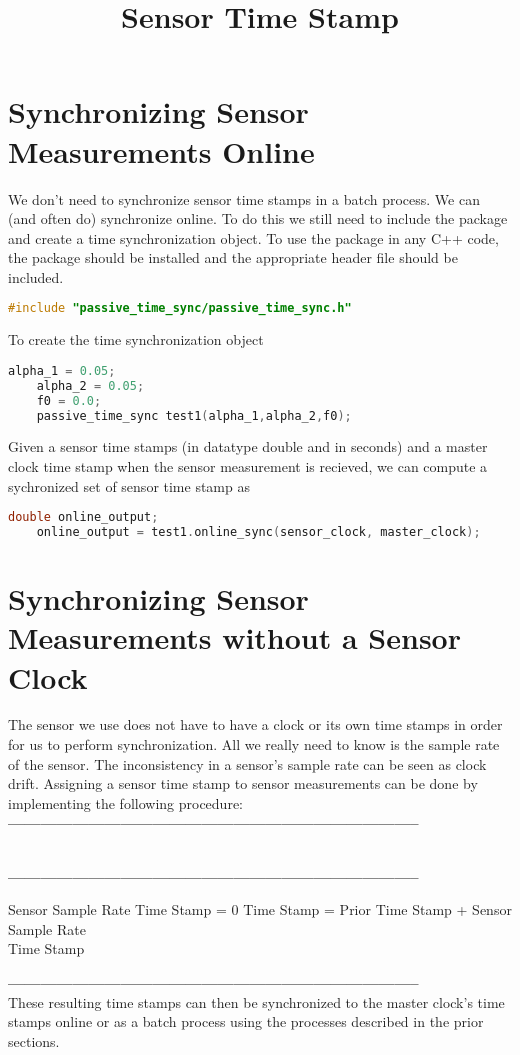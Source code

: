 \documentclass[11pt,a4paper]{article}
\begin{document}
\section{Synchronizing Sensor Measurements Online}

We don't need to synchronize sensor time stamps in a batch process. We can (and often do) synchronize online. To do this we still need to include the package and create a time synchronization object. To use the package in any C++ code, the package should be installed and the appropriate header file should be included.
\begin{lstlisting}[language=C++]
	#include "passive_time_sync/passive_time_sync.h"
\end{lstlisting}

To create the time synchronization object
\begin{lstlisting}[language=C++]
	alpha_1 = 0.05;
	alpha_2 = 0.05;
	f0 = 0.0;
	passive_time_sync test1(alpha_1,alpha_2,f0);
\end{lstlisting}

Given a sensor time stamps (in datatype double and in seconds) and a master clock time stamp when the sensor measurement is recieved, we can compute a sychronized set of sensor time stamp as
\begin{lstlisting}[language=C++]
	double online_output;
	online_output = test1.online_sync(sensor_clock, master_clock);
\end{lstlisting}

\section{Synchronizing Sensor Measurements without a Sensor Clock} 

The sensor we use does not have to have a clock or its own time stamps in order for us to perform synchronization. All we really need to know is the sample rate of the sensor. The inconsistency in a sensor's sample rate can be seen as clock drift. Assigning a sensor time stamp to sensor measurements can be done by implementing the following procedure: \\
\textbf{-----------------------------------------------------------------------------}\\
\title{\textbf{Sensor Time Stamp}} \\
\textbf{-----------------------------------------------------------------------------
}
\begin{algorithmic}
	\Require Sensor Sample Rate
		\State Time Stamp = 0
	\Else
		\State Time Stamp = Prior Time Stamp + Sensor Sample Rate
	\EndIf \\
	\Return Time Stamp
\end{algorithmic}
\textbf{-----------------------------------------------------------------------------
} \\
These resulting time stamps can then be synchronized to the master clock's time stamps online or as a batch process using the processes described in the prior sections.
\end{document}
